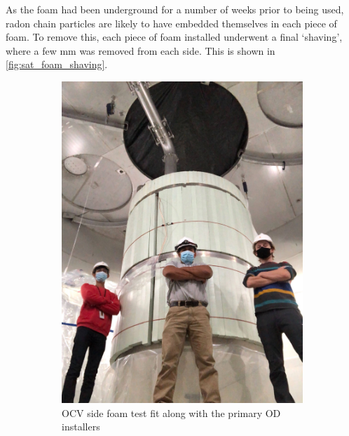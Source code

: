 \par
As the foam had been underground for a number of weeks prior to being used, radon chain particles are likely to have embedded themselves in each piece of foam.
To remove this, each piece of foam installed underwent a final `shaving', where a few mm was removed from each side.
This is shown in \autoref{fig:sat_foam_shaving}.

\begin{figure}[]
  \begin{subfigure}{.5\textwidth}
  \centering
  \includegraphics[width=\linewidth]{Figures/Construction/SAT_foam_fittest.jpg}
  \caption{OCV side foam test fit along with the primary OD installers}
  \label{fig:sat_foam_fit_test}
  \end{subfigure}
  \begin{subfigure}{.5\textwidth}
  \centering

\end{subfigure}
\end{figure}
